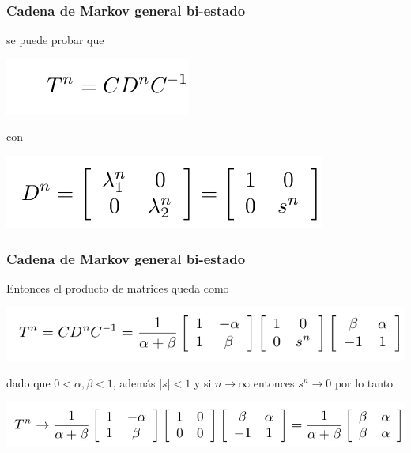 \documentclass[spanish]{beamer}
\begin{document}
\begin{frame}
\frametitle{Cadena de Markov general bi-estado}
se puede probar que 
\begin{center}
\includegraphics[scale=0.4]{im14}
\end{center}
con
\begin{center}
\includegraphics[scale=0.4]{im15}
\end{center}

\end{frame}
\begin{frame}
\frametitle{Cadena de Markov general bi-estado}
Entonces el producto de matrices queda como 

\begin{center}
\includegraphics[scale=0.4]{im16}
\end{center}

dado que $0<\alpha,\beta < 1$, además $\vert s\vert <1$ y si $n\rightarrow \infty $ entonces $s^{n} \rightarrow 0$ por lo tanto
\begin{center}
\includegraphics[scale=0.4]{im17}
\end{center}

\end{frame}
\end{document}
